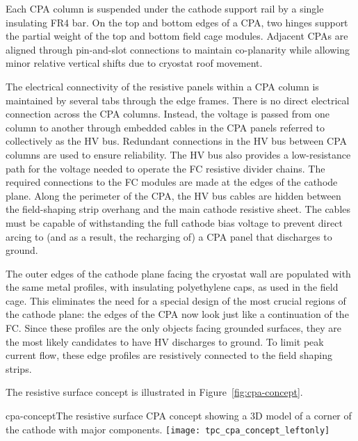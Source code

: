 Each CPA column is suspended under the cathode support rail by a single insulating FR4 bar.  On the top and bottom edges of a CPA, two hinges support the partial weight of the top and bottom field cage modules.   Adjacent CPAs are aligned through pin-and-slot connections to maintain co-planarity while allowing minor relative vertical shifts due to cryostat roof movement.

The electrical connectivity of the resistive panels within a CPA column is maintained by several tabs through the edge frames.  There is no direct electrical connection across the CPA columns. 
Instead, the voltage is passed from one column to another through embedded cables in the CPA panels referred to collectively as the HV bus.  Redundant connections in the HV bus between CPA columns are used to ensure reliability.  
The HV bus also provides a low-resistance path for the voltage needed to operate the FC resistive divider chains.
The required connections to the FC modules are made at the edges of the cathode plane. 
Along the perimeter of the CPA, the HV bus cables are hidden between the field-shaping strip overhang and the main cathode resistive sheet.  The cables must be capable of withstanding the full cathode bias voltage to prevent direct arcing to (and as a result, the recharging of) a CPA panel that discharges to ground. 

The outer edges of the cathode plane facing the cryostat wall are populated with the same metal profiles, with insulating polyethylene caps, as used in the field cage.  This eliminates the need for a special design of the most crucial regions of the cathode plane: the edges of the CPA now look just like a continuation of the FC.  Since these profiles are the only objects facing grounded surfaces, they are the most likely candidates to have HV discharges to ground.   To limit peak current flow, these edge profiles are resistively connected to the field shaping strips.


The resistive surface concept is illustrated in Figure~\ref{fig:cpa-concept}.

\begin{cdrfigure}{cpa-concept}{The resistive surface CPA concept showing  
 a 3D model of a corner of the cathode with major components.} 
\texttt{[image: tpc\_cpa\_concept\_leftonly]}
\end{cdrfigure}


